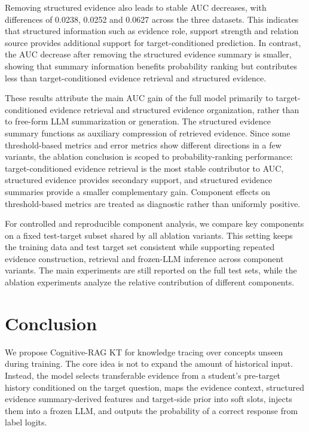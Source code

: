 \documentclass[a4paper,12pt]{article}
\numberwithin{table}{section}
\begin{document}
Removing structured evidence also leads to stable AUC decreases, with differences of 0.0238, 0.0252 and 0.0627 across the three datasets. This indicates that structured information such as evidence role, support strength and relation source provides additional support for target-conditioned prediction. In contrast, the AUC decrease after removing the structured evidence summary is smaller, showing that summary information benefits probability ranking but contributes less than target-conditioned evidence retrieval and structured evidence.

These results attribute the main AUC gain of the full model primarily to target-conditioned evidence retrieval and structured evidence organization, rather than to free-form LLM summarization or generation. The structured evidence summary functions as auxiliary compression of retrieved evidence. Since some threshold-based metrics and error metrics show different directions in a few variants, the ablation conclusion is scoped to probability-ranking performance: target-conditioned evidence retrieval is the most stable contributor to AUC, structured evidence provides secondary support, and structured evidence summaries provide a smaller complementary gain. Component effects on threshold-based metrics are treated as diagnostic rather than uniformly positive.

For controlled and reproducible component analysis, we compare key components on a fixed test-target subset shared by all ablation variants. This setting keeps the training data and test target set consistent while supporting repeated evidence construction, retrieval and frozen-LLM inference across component variants. The main experiments are still reported on the full test sets, while the ablation experiments analyze the relative contribution of different components.

\section{Conclusion}

We propose Cognitive-RAG KT for knowledge tracing over concepts unseen during training. The core idea is not to expand the amount of historical input. Instead, the model selects transferable evidence from a student's pre-target history conditioned on the target question, maps the evidence context, structured evidence summary-derived features and target-side prior into soft slots, injects them into a frozen LLM, and outputs the probability of a correct response from label logits.
\end{document}
